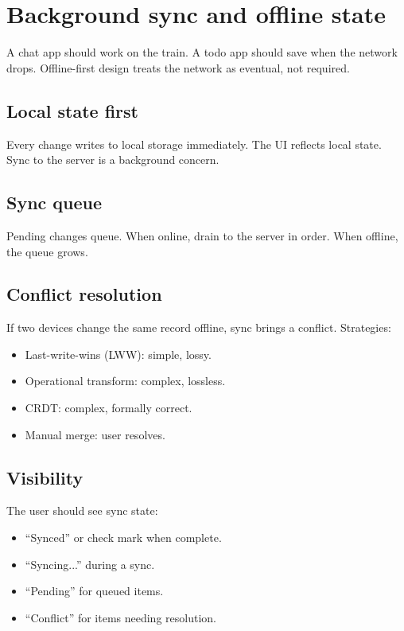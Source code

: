 \chapter{Background sync and offline state}
\label{ch:offline}

\begin{aside}
A chat app should work on the train. A todo app should save
when the network drops. Offline-first design treats the
network as eventual, not required.
\end{aside}

\section{Local state first}

Every change writes to local storage immediately. The
UI reflects local state. Sync to the server is a
background concern.

\section{Sync queue}

Pending changes queue. When online, drain to the server in
order. When offline, the queue grows.

\section{Conflict resolution}

If two devices change the same record offline, sync brings
a conflict. Strategies:

\begin{itemize}[leftmargin=*]
  \item Last-write-wins (LWW): simple, lossy.
  \item Operational transform: complex, lossless.
  \item CRDT: complex, formally correct.
  \item Manual merge: user resolves.
\end{itemize}

\section{Visibility}

The user should see sync state:

\begin{itemize}[leftmargin=*]
  \item ``Synced'' or check mark when complete.
  \item ``Syncing...'' during a sync.
  \item ``Pending'' for queued items.
  \item ``Conflict'' for items needing resolution.
\end{itemize}

